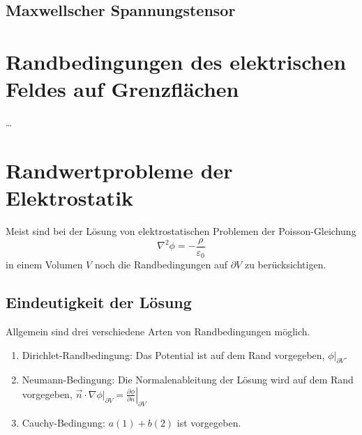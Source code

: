 \subsection{Maxwellscher Spannungstensor}

\section{Randbedingungen des elektrischen Feldes auf Grenzflächen\label{sec:randbedingungen_auf_grenzflaechen}}

 {\ldots}

\section{Randwertprobleme der Elektrostatik}

Meist sind bei der Lösung von elektrostatischen Problemen der Poisson-Gleichung
\begin{equation*}
	\nabla ^{2}\phi =-\frac{\rho }{\varepsilon _{0}}
\end{equation*}
in einem Volumen $V$ noch die Randbedingungen auf $\partial V$ zu berücksichtigen.

\subsection{Eindeutigkeit der Lösung}

Allgemein sind drei verschiedene Arten von Randbedingungen möglich. 

\begin{enumerate}
	\item Dirichlet-Randbedingung: Das Potential ist auf dem Rand vorgegeben, $\left.\hspace{0pt}\phi \right| _{\partial V}$.

	\item Neumann-Bedingung: Die Normalenableitung der Lösung wird auf dem Rand vorgegeben, $\vec {n}\cdot \left.\hspace{0pt}\nabla \phi \right| _{\partial V}=\left.\frac{\partial \phi }{\partial n}\right| _{\partial V}$

	\item Cauchy-Bedingung: $a\left(1\right)+b\left(2\right)$ ist vorgegeben.
\end{enumerate}

